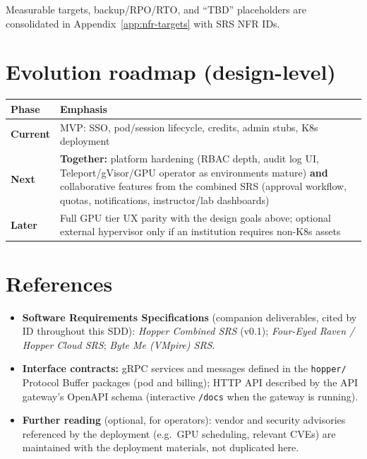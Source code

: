 \documentclass[12pt,a4paper]{article}
\newcommand{\ByteMeHeading}{Byte Me}
\begin{document}
\vspace{0.5em}
\noindent Measurable targets, backup/RPO/RTO, and ``TBD'' placeholders are consolidated in Appendix~\ref{app:nfr-targets} with SRS NFR IDs.

\section{Evolution roadmap (design-level)}
\label{sec:roadmap}

\begin{tabularx}{\textwidth}{@{}L{3cm} X@{}}
  \toprule
  \textbf{Phase} & \textbf{Emphasis} \\
  \midrule
  \textbf{Current} & MVP: SSO, pod/session lifecycle, credits, admin stubs, K8s deployment \\
  \textbf{Next} & \textbf{Together:} platform hardening (RBAC depth, audit log UI, Teleport/gVisor/GPU operator as environments mature) \textbf{and} collaborative features from the combined SRS (approval workflow, quotas, notifications, instructor/lab dashboards) \\
  \textbf{Later} & Full GPU tier UX parity with the design goals above; optional external hypervisor only if an institution requires non-K8s assets \\
  \bottomrule
\end{tabularx}


\newpage
\section{References}
\label{sec:references}

\begin{itemize}[leftmargin=*]
  \item \textbf{Software Requirements Specifications} (companion deliverables, cited by ID throughout this SDD): \emph{Hopper Combined SRS} (v0.1); \emph{Four-Eyed Raven / Hopper Cloud SRS}; \emph{\ByteMeHeading{} (VMpire) SRS}.
  \item \textbf{Interface contracts:} gRPC services and messages defined in the \texttt{hopper/} Protocol Buffer packages (pod and billing); HTTP API described by the API gateway's OpenAPI schema (interactive \texttt{/docs} when the gateway is running).
  \item \textbf{Further reading} (optional, for operators): vendor and security advisories referenced by the deployment (e.g.\ GPU scheduling, relevant CVEs) are maintained with the deployment materials, not duplicated here.
\end{itemize}
\end{document}
